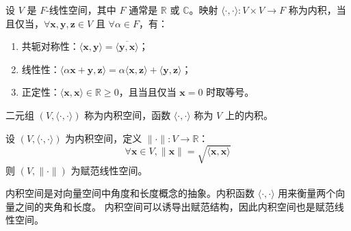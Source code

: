 \begin{definition}
    设 $ V $ 是 $F$-线性空间，其中 $F$ 通常是 $\mathbb{R}$ 或 $\mathbb{C}$。映射 $ \langle\cdot,\cdot\rangle:V\times V\to F $ 称为内积，当且仅当，$ \forall \mathbf{x},\mathbf{y},\mathbf{z}\in V $ 且 $ \forall \alpha\in F $，有：
    \begin{enumerate}
        \item 共轭对称性：$ \langle \mathbf{x},\mathbf{y}\rangle=\overline{\langle \mathbf{y},\mathbf{x}\rangle} $；
        \item 线性性：$ \langle \alpha \mathbf{x}+\mathbf{y},\mathbf{z}\rangle=\alpha\langle \mathbf{x},\mathbf{z}\rangle+\langle \mathbf{y},\mathbf{z}\rangle $；
        \item 正定性：$ \langle \mathbf{x},\mathbf{x}\rangle \in \mathbb{R} \geq 0 $，且当且仅当 $ \mathbf{x}=0 $ 时取等号。
    \end{enumerate}
    二元组 $ (V,\langle\cdot,\cdot\rangle) $ 称为内积空间，函数 $ \langle\cdot,\cdot\rangle $ 称为 $ V $ 上的内积。
    \label{def:inner_product_space}
\end{definition}

\begin{proposition}[内积空间诱导的赋范线性空间]
    设 $ (V,\langle\cdot,\cdot\rangle) $ 为内积空间，定义 $ \|\cdot\|:V\to \mathbb{R} $：
    \[
        \forall \mathbf{x}\in V, \|\mathbf{x}\|=\sqrt{\langle \mathbf{x},\mathbf{x}\rangle}
    \]
    则 $ (V,\|\cdot\|) $ 为赋范线性空间。
\end{proposition}

\begin{note}
    内积空间是对向量空间中角度和长度概念的抽象。内积函数 $ \langle\cdot,\cdot\rangle $ 用来衡量两个向量之间的夹角和长度。
    内积空间可以诱导出赋范结构，因此内积空间也是赋范线性空间。
\end{note}

\newpage